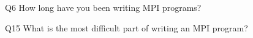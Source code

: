 \begin{description}%
\item{Q6} How long have you been writing MPI programs?%
\item{Q15} What is the most difficult part of writing an MPI program?%
\end{description}%

